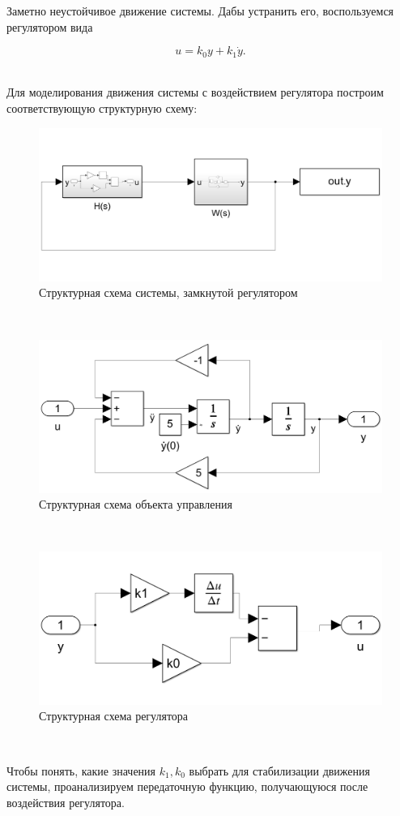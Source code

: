 \documentclass[a4paper]{article}
\begin{document}
Заметно неустойчивое движение системы. Дабы устранить его, воспользуемся регулятором вида 

$$
u = k_0y + k_1\dot{y}.
$$\

Для моделирования движения системы с воздействием регулятора построим соответствующую структурную схему:

\begin{figure}[H]
    \centering
    \includegraphics[width=0.65\linewidth]{ex1/scheme_main.png}
    \caption{Структурная схема системы, замкнутой регулятором}
\end{figure}\

\begin{figure}[H]
    \centering
    \includegraphics[width=0.65\linewidth]{ex1/scheme_ws.png}
    \caption{Структурная схема объекта управления}
\end{figure}\

\begin{figure}[H]
    \centering
    \includegraphics[width=0.65\linewidth]{ex1/scheme_hs.png}
    \caption{Структурная схема регулятора}
\end{figure}\

Чтобы понять, какие значения $k_1, k_0$ выбрать для стабилизации движения системы, проанализируем передаточную функцию, получающуюся после воздействия регулятора.\ 
\end{document}
